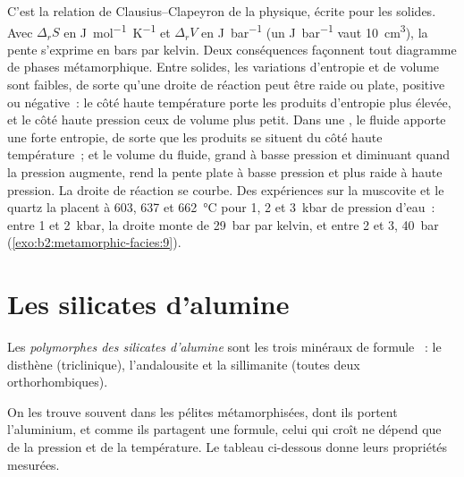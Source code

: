 C'est la relation de Clausius--Clapeyron de la physique, écrite pour les solides. Avec
$\Delta_r S$ en \unit{J.mol^{-1}.K^{-1}} et $\Delta_r V$ en \unit{J.bar^{-1}} (un
\unit{J.bar^{-1}} vaut \qty{10}{cm^3}), la pente s'exprime en bars par kelvin. Deux
conséquences façonnent tout diagramme de phases métamorphique. Entre solides, les variations
d'entropie et de volume sont faibles, de sorte qu'une droite de réaction peut être raide ou plate,
positive ou négative~: le côté haute température porte les produits d'entropie plus élevée, et le
côté haute pression ceux de volume plus petit. Dans une , le fluide
apporte une forte entropie, de sorte que les produits se situent du côté haute température~; et le volume
du fluide, grand à basse pression et diminuant quand la pression augmente, rend la pente plate
à basse pression et plus raide à haute pression. La droite de réaction se courbe.
Des expériences sur la muscovite et le quartz la placent à 603, 637 et \qty{662}{\celsius} pour 1,
2 et \qty{3}{kbar} de pression d'eau~: entre 1 et \qty{2}{kbar}, la droite monte de
\qty{29}{bar} par kelvin, et entre 2 et 3, \qty{40}{bar} (\cref{exo:b2:metamorphic-facies:9}).

\section{Les silicates d'alumine}\label{sec:b2:metamorphic-facies:al2sio5}

\begin{definition}\label{def:b2:metamorphic-facies:al2sio5}
Les \emph{polymorphes des silicates d'alumine} sont les trois
minéraux de formule ~: le disthène (triclinique), l'andalousite et la sillimanite (toutes deux
orthorhombiques).
\end{definition}

On les trouve souvent dans les pélites métamorphisées, dont ils portent l'aluminium, et comme ils
partagent une formule, celui qui croît ne dépend que de la pression et de la température. Le tableau
ci-dessous donne leurs propriétés mesurées.

